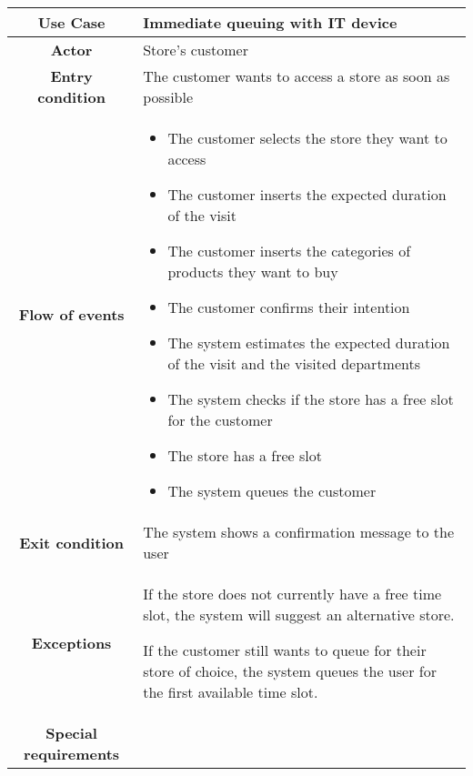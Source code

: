 \documentclass[../../main.tex]{subfiles}
\begin{document}
      \begin{table}[H]
        \centering
          \begin{tabular}{c m{}}
          \hline
          \textbf{Use Case} & Immediate queuing with IT device\\ \hline
          \textbf{Actor} & Store's customer\\ \hline
          \textbf{Entry condition} & The customer wants to access a store as soon as possible\\  \hline
          \textbf{Flow of events} & \begin{itemize}
                                      \item The customer selects the store they want to access
                                      \item The customer inserts the expected duration of the visit
                                      \item The customer inserts the categories of products they want to buy
                                      \item The customer confirms their intention
                                      \item The system estimates the expected duration of the visit and the visited departments
                                      \item The system checks if the store has a free slot for the customer
                                      \item The store has a free slot
                                      \item The system queues the customer
                                    \end{itemize}\\ \hline
          \textbf{Exit condition} & The system shows a confirmation message to the user \\ \hline
          \textbf{Exceptions} &  If the store does not currently have a free time slot, the system will suggest an alternative store.
                                  
                                If the customer still wants to queue for their store of choice, the system queues the user for the first available time slot. \\ \hline
          \textbf{Special requirements} &\\ \hline
          \end{tabular}
      \end{table}
\end{document}
